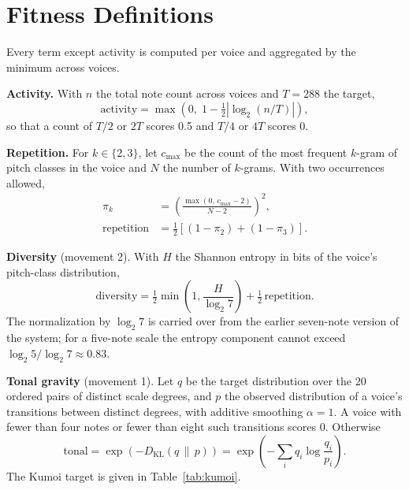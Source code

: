 \documentclass[conference]{IEEEtran}
\begin{document}
\section{Fitness Definitions}
\label{app:fitness}

Every term except activity is computed per voice and aggregated by the minimum across voices.

\textbf{Activity.} With $n$ the total note count across voices and $T = 288$ the target,
\begin{equation}
\text{activity} = \max\!\left(0,\; 1 - \tfrac{1}{2}\left|\log_2 (n/T)\right|\right),
\end{equation}
so that a count of $T/2$ or $2T$ scores 0.5 and $T/4$ or $4T$ scores 0.

\textbf{Repetition.} For $k \in \{2, 3\}$, let $c_{\max}$ be the count of the most frequent $k$-gram of pitch classes in the voice and $N$ the number of $k$-grams. With two occurrences allowed,
\begin{align}
\pi_k &= \left(\frac{\max(0,\, c_{\max} - 2)}{N - 2}\right)^{2}, \\
\text{repetition} &= \tfrac{1}{2}\left[(1 - \pi_2) + (1 - \pi_3)\right].
\end{align}

\textbf{Diversity} (movement 2). With $H$ the Shannon entropy in bits of the voice's pitch-class distribution,
\begin{equation}
\text{diversity} = \tfrac{1}{2}\min\!\left(1, \frac{H}{\log_2 7}\right) + \tfrac{1}{2}\,\text{repetition}.
\end{equation}
The normalization by $\log_2 7$ is carried over from the earlier seven-note version of the system; for a five-note scale the entropy component cannot exceed $\log_2 5 / \log_2 7 \approx 0.83$.

\textbf{Tonal gravity} (movement 1). Let $q$ be the target distribution over the 20 ordered pairs of distinct scale degrees, and $p$ the observed distribution of a voice's transitions between distinct degrees, with additive smoothing $\alpha = 1$. A voice with fewer than four notes or fewer than eight such transitions scores 0. Otherwise
\begin{equation}
\text{tonal} = \exp\!\left(-D_{\mathrm{KL}}(q \,\|\, p)\right) = \exp\!\left(-\sum_i q_i \log \frac{q_i}{p_i}\right).
\end{equation}
The Kumoi target is given in Table~\ref{tab:kumoi}.
\end{document}

